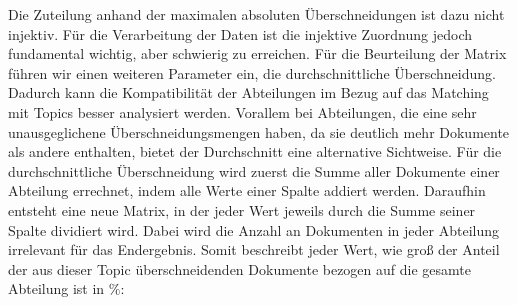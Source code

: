\documentclass[german,version-2020-11]{uzl-thesis}
\begin{document}
Die Zuteilung anhand der maximalen absoluten Überschneidungen ist dazu nicht injektiv. Für die Verarbeitung der Daten ist die injektive Zuordnung jedoch fundamental wichtig, aber schwierig zu erreichen. Für die Beurteilung der Matrix führen wir einen weiteren Parameter ein, die durchschnittliche Überschneidung. Dadurch kann die Kompatibilität der Abteilungen im Bezug auf das Matching mit Topics besser analysiert werden. Vorallem bei Abteilungen, die eine sehr unausgeglichene Überschneidungsmengen haben, da sie deutlich mehr Dokumente als andere enthalten, bietet der Durchschnitt eine alternative Sichtweise. Für die durchschnittliche Überschneidung wird zuerst die Summe aller Dokumente einer Abteilung errechnet, indem alle Werte einer Spalte addiert werden. Daraufhin entsteht eine neue Matrix, in der jeder Wert jeweils durch die Summe seiner Spalte dividiert wird. Dabei wird die Anzahl an Dokumenten in jeder Abteilung irrelevant für das Endergebnis. Somit beschreibt jeder Wert, wie groß der Anteil der aus dieser Topic überschneidenden Dokumente bezogen auf die gesamte Abteilung ist in $\%$: \\
\end{document}
